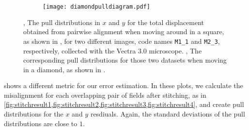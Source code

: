 \documentclass{article}
\newcommand{\M}[2]{\texttt{M#1\_#2}}
\begin{document}
\begin{figure}[ht]
\begin{subfigure}{0.32\linewidth}
		\caption{}
		\label{fig:diamondpull2}
	\end{subfigure}
	\begin{subfigure}{0.32\linewidth}
		\texttt{[image: diamondpulldiagram.pdf]}
		\caption{}
		\label{fig:diamondpulldiagram}
	\end{subfigure}
	\caption{,  The pull distributions in $x$ and $y$ for the total displacement obtained from pairwise alignment when moving around in a square, as shown in , for two different images, code names \M11 and \M23, respectively, collected with the Vectra 3.0 microscope.  ,  The corresponding pull distributions for those two datasets when moving in a diamond, as shown in .}
	\label{fig:squarepulls}
\end{figure}

 shows a different metric for our error estimation.  In these plots, we calculate the misalignment for each overlapping pair of fields after stitching, as in \cref{fig:stitchresult1,fig:stitchresult2,fig:stitchresult3,fig:stitchresult4}, and create pull distributions for the $x$ and $y$ resdiuals.  Again, the standard deviations of the pull distributions are close to $1$.
\end{document}
